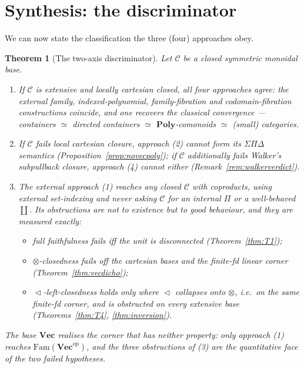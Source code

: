 \documentclass[11pt]{amsart}
\theoremstyle{plain}
\newtheorem{theorem}{Theorem}[section]
\theoremstyle{definition}
\theoremstyle{remark}
\newcommand{\C}{\mathcal{C}}
\newcommand{\Vect}{\mathbf{Vec}}
\newcommand{\Fam}{\mathrm{Fam}}
\newcommand{\Poly}{\mathbf{Poly}}
\renewcommand{\lhd}{\vartriangleleft}
\newcommand{\op}{\mathrm{op}}
\begin{document}
\section{Synthesis: the discriminator}\label{sec:synthesis}

We can now state the classification the three (four) approaches obey.

\begin{theorem}[The two-axis discriminator]\label{thm:discriminator}
Let $\C$ be a closed symmetric monoidal base.
\begin{enumerate}
\item If $\C$ is extensive and locally cartesian closed, all four approaches agree: the external
family, indexed-polynomial, family-fibration and codomain-fibration constructions coincide, and one
recovers the classical convergence --- containers $\simeq$ directed containers $\simeq$
$\Poly$-comonoids $\simeq$ (small) categories.
\item If $\C$ fails local cartesian closure, approach (2) cannot form its $\Sigma\Pi\Delta$ semantics
(Proposition~\ref{prop:novecpoly}); if $\C$ additionally fails Walker's subpullback closure, approach
(4) cannot either (Remark~\ref{rem:walkerverdict}).
\item The external approach (1) reaches any closed $\C$ with coproducts, using external set-indexing
and never asking $\C$ for an internal $\Pi$ or a well-behaved $\coprod$. Its obstructions are not to
\emph{existence} but to \emph{good behaviour}, and they are measured exactly:
\begin{itemize}
\item full faithfulness fails iff the unit is disconnected (Theorem~\ref{thm:T1});
\item $\otimes$-closedness fails off the cartesian bases and the finite-fd linear corner
(Theorem~\ref{thm:vecdicho});
\item $\lhd$-left-closedness holds only where $\lhd$ collapses onto $\otimes$, i.e.\ on the same
finite-fd corner, and is obstructed on every extensive base (Theorems~\ref{thm:T4},
\ref{thm:inversion}).
\end{itemize}
\end{enumerate}
The base $\Vect$ realises the corner that has neither property: only approach (1) reaches
$\Fam(\Vect^\op)$, and the three obstructions of (3) are the quantitative face of the two failed
hypotheses.
\end{theorem}
\end{document}
